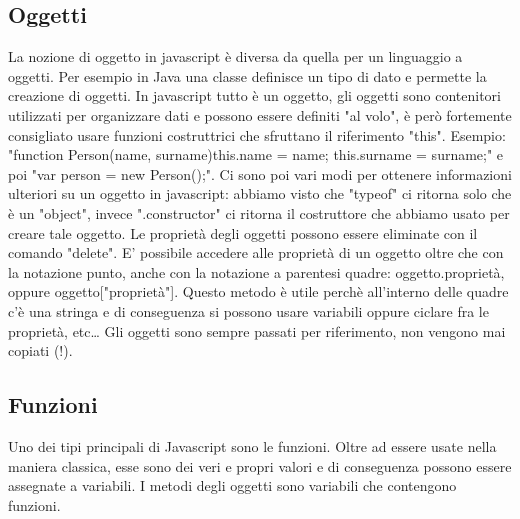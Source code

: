 \subsection{Oggetti}
La nozione di oggetto in javascript è diversa da quella per un linguaggio a oggetti. Per esempio in Java una classe definisce un tipo di dato e permette la creazione di oggetti. In javascript tutto è un oggetto, gli oggetti sono contenitori utilizzati per organizzare dati e possono essere definiti "al volo", è però fortemente consigliato usare funzioni costruttrici che sfruttano il riferimento "this". Esempio: "function Person(name, surname){this.name = name; this.surname = surname;}" e poi "var person = new Person();". Ci sono poi vari modi per ottenere informazioni ulteriori su un oggetto in javascript: abbiamo visto che "typeof" ci ritorna solo che è un "object", invece ".constructor" ci ritorna il costruttore che abbiamo usato per creare tale oggetto.\newline
\newline
Le proprietà degli oggetti possono essere eliminate con il comando "delete".\newline
\newline
E' possibile accedere alle proprietà di un oggetto oltre che con la notazione punto, anche con la notazione a parentesi quadre: oggetto.proprietà, oppure oggetto["proprietà"]. Questo metodo è utile perchè all'interno delle quadre c'è una stringa e di conseguenza si possono usare variabili oppure ciclare fra le proprietà, etc\dots \newline
\newline
Gli oggetti sono sempre passati per riferimento, non vengono mai copiati (!).
\subsection{Funzioni}
Uno dei tipi principali di Javascript sono le funzioni. Oltre ad essere usate nella maniera classica, esse sono dei veri e propri valori e di conseguenza possono essere assegnate a variabili. I metodi degli oggetti sono variabili che contengono funzioni.
